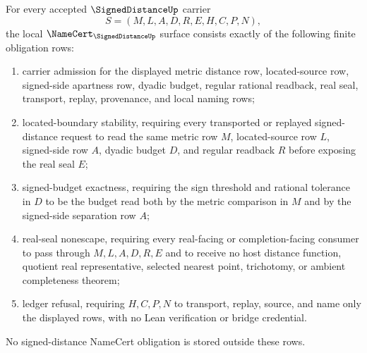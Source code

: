 \begin{theorem}
\label{thm:signed-distance-namecert-obligations}
For every accepted $\SignedDistanceUp$ carrier
$$
S=(M,L,A,D,R,E,H,C,P,N),
$$
the local $\NameCert_{\SignedDistanceUp}$ surface consists exactly of the following finite obligation rows:
\begin{enumerate}
\item carrier admission for the displayed metric distance row, located-source row, signed-side apartness row, dyadic budget, regular rational readback, real seal, transport, replay, provenance, and local naming rows;
\item located-boundary stability, requiring every transported or replayed signed-distance request to read the same metric row $M$, located-source row $L$, signed-side row $A$, dyadic budget $D$, and regular readback $R$ before exposing the real seal $E$;
\item signed-budget exactness, requiring the sign threshold and rational tolerance in $D$ to be the budget read both by the metric comparison in $M$ and by the signed-side separation row $A$;
\item real-seal nonescape, requiring every real-facing or completion-facing consumer to pass through $M,L,A,D,R,E$ and to receive no host distance function, quotient real representative, selected nearest point, trichotomy, or ambient completeness theorem;
\item ledger refusal, requiring $H,C,P,N$ to transport, replay, source, and name only the displayed rows, with no Lean verification or bridge credential.
\end{enumerate}
No signed-distance NameCert obligation is stored outside these rows.
\end{theorem}
